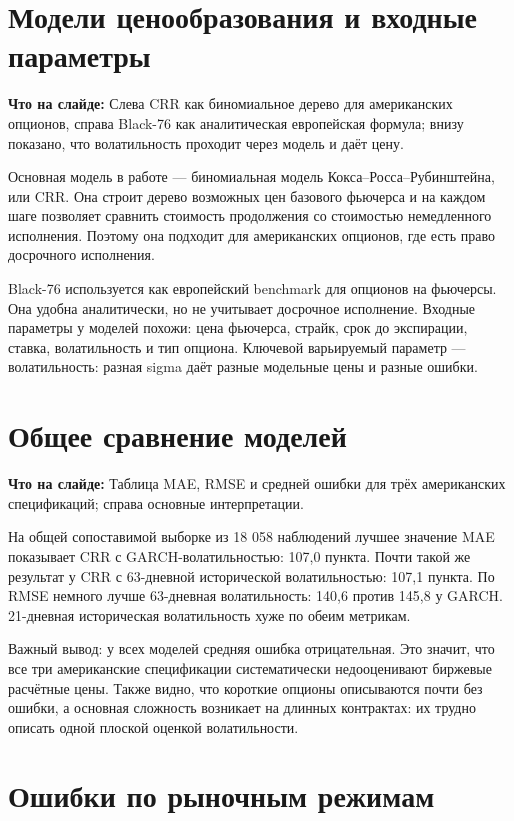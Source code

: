 \documentclass[11pt,a4paper]{article}
\newcommand{\whatsonslide}[1]{%
  \noindent\colorbox{softblue}{%
    \parbox{\dimexpr\linewidth-2\fboxsep\relax}{\textbf{Что на слайде:} #1}%
  }\par\vspace{0.2em}
}
\begin{document}
\section{Модели ценообразования и входные параметры}

\whatsonslide{Слева CRR как биномиальное дерево для американских опционов, справа Black-76 как аналитическая европейская формула; внизу показано, что волатильность проходит через модель и даёт цену.}

Основная модель в работе --- биномиальная модель Кокса--Росса--Рубинштейна, или CRR. Она строит дерево возможных цен базового фьючерса и на каждом шаге позволяет сравнить стоимость продолжения со стоимостью немедленного исполнения. Поэтому она подходит для американских опционов, где есть право досрочного исполнения.

Black-76 используется как европейский benchmark для опционов на фьючерсы. Она удобна аналитически, но не учитывает досрочное исполнение. Входные параметры у моделей похожи: цена фьючерса, страйк, срок до экспирации, ставка, волатильность и тип опциона. Ключевой варьируемый параметр --- волатильность: разная sigma даёт разные модельные цены и разные ошибки.

\section{Общее сравнение моделей}

\whatsonslide{Таблица MAE, RMSE и средней ошибки для трёх американских спецификаций; справа основные интерпретации.}

На общей сопоставимой выборке из 18 058 наблюдений лучшее значение MAE показывает CRR с GARCH-волатильностью: 107,0 пункта. Почти такой же результат у CRR с 63-дневной исторической волатильностью: 107,1 пункта. По RMSE немного лучше 63-дневная волатильность: 140,6 против 145,8 у GARCH. 21-дневная историческая волатильность хуже по обеим метрикам.

Важный вывод: у всех моделей средняя ошибка отрицательная. Это значит, что все три американские спецификации систематически недооценивают биржевые расчётные цены. Также видно, что короткие опционы описываются почти без ошибки, а основная сложность возникает на длинных контрактах: их трудно описать одной плоской оценкой волатильности.

\section{Ошибки по рыночным режимам}
\end{document}
